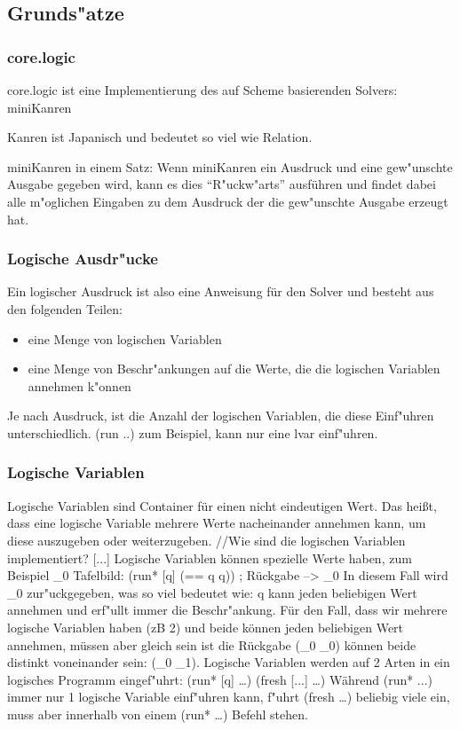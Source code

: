 \subsection{Grunds"atze}

\subsubsection{core.logic}

core.logic ist eine Implementierung des auf Scheme basierenden Solvers: miniKanren

Kanren ist Japanisch und bedeutet so viel wie Relation.

miniKanren in einem Satz: Wenn miniKanren ein Ausdruck und eine gew"unschte Ausgabe gegeben wird, kann es dies “R"uckw"arts” ausführen und findet dabei alle m"oglichen Eingaben zu dem Ausdruck der die gew"unschte Ausgabe erzeugt hat.

\subsubsection{Logische Ausdr"ucke}

Ein logischer Ausdruck ist also eine Anweisung für den Solver und besteht aus den folgenden Teilen:
\begin{itemize}

\item eine Menge von logischen Variablen

\item eine Menge von Beschr"ankungen auf die Werte, die die logischen Variablen annehmen k"onnen

\end{itemize}

Je nach Ausdruck, ist die Anzahl der logischen Variablen, die diese Einf"uhren unterschiedlich. (run ..) zum Beispiel, kann nur eine lvar einf"uhren.


\subsubsection{Logische Variablen}
Logische Variablen sind Container für einen nicht eindeutigen Wert. Das heißt, dass eine logische Variable mehrere Werte nacheinander annehmen kann, um diese auszugeben oder weiterzugeben.
//Wie sind die logischen Variablen implementiert? [...]
Logische Variablen können spezielle Werte haben, zum Beispiel _0 
Tafelbild: (run* [q] (== q q)) ; Rückgabe --> _0
In diesem Fall wird _0 zur"uckgegeben, was so viel bedeutet wie: q kann jeden beliebigen Wert annehmen und erf"ullt immer die Beschr"ankung.
Für den Fall, dass wir mehrere logische Variablen haben (zB 2) und beide können jeden beliebigen Wert annehmen, müssen aber gleich sein ist die Rückgabe (_0 _0) können beide distinkt voneinander sein: (_0 _1).
Logische Variablen werden auf 2 Arten in ein logisches Programm eingef"uhrt:
(run* [q] …)
(fresh [...] …)
Während (run* ...) immer nur 1 logische Variable einf"uhren kann, f"uhrt (fresh …) beliebig viele ein, muss aber innerhalb von einem (run* …) Befehl stehen.

